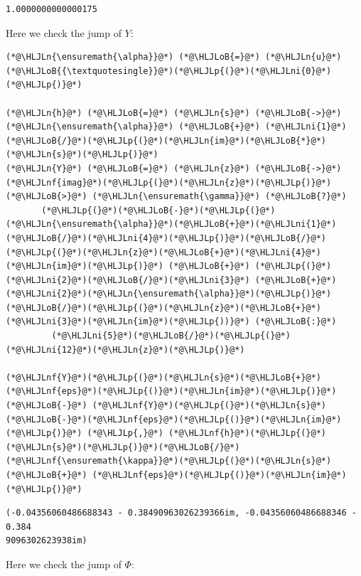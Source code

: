 \documentclass[12pt,a4paper]{article}
\newcommand{\HLJLn}[1]{#1}
\newcommand{\HLJLnf}[1]{\textcolor[RGB]{66,102,213}{#1}}
\newcommand{\HLJLni}[1]{\textcolor[RGB]{59,151,46}{#1}}
\newcommand{\HLJLoB}[1]{\textcolor[RGB]{102,102,102}{\textbf{#1}}}
\newcommand{\HLJLp}[1]{#1}
\begin{document}
\begin{lstlisting}
1.0000000000000175
\end{lstlisting}


Here we check the jump of $Y$:


\begin{lstlisting}
(*@\HLJLn{\ensuremath{\alpha}}@*) (*@\HLJLoB{=}@*) (*@\HLJLn{u}@*)(*@\HLJLoB{{\textquotesingle}}@*)(*@\HLJLp{(}@*)(*@\HLJLni{0}@*)(*@\HLJLp{)}@*)

(*@\HLJLn{h}@*) (*@\HLJLoB{=}@*) (*@\HLJLn{s}@*) (*@\HLJLoB{->}@*) (*@\HLJLn{\ensuremath{\alpha}}@*) (*@\HLJLoB{+}@*) (*@\HLJLni{1}@*)(*@\HLJLoB{/}@*)(*@\HLJLp{(}@*)(*@\HLJLn{im}@*)(*@\HLJLoB{*}@*)(*@\HLJLn{s}@*)(*@\HLJLp{)}@*)
(*@\HLJLn{Y}@*) (*@\HLJLoB{=}@*) (*@\HLJLn{z}@*) (*@\HLJLoB{->}@*) (*@\HLJLnf{imag}@*)(*@\HLJLp{(}@*)(*@\HLJLn{z}@*)(*@\HLJLp{)}@*) (*@\HLJLoB{>}@*) (*@\HLJLn{\ensuremath{\gamma}}@*) (*@\HLJLoB{?}@*) 
       (*@\HLJLp{(}@*)(*@\HLJLoB{-}@*)(*@\HLJLp{(}@*)(*@\HLJLn{\ensuremath{\alpha}}@*)(*@\HLJLoB{+}@*)(*@\HLJLni{1}@*)(*@\HLJLoB{/}@*)(*@\HLJLni{4}@*)(*@\HLJLp{)}@*)(*@\HLJLoB{/}@*)(*@\HLJLp{(}@*)(*@\HLJLn{z}@*)(*@\HLJLoB{+}@*)(*@\HLJLni{4}@*)(*@\HLJLn{im}@*)(*@\HLJLp{)}@*) (*@\HLJLoB{+}@*) (*@\HLJLp{(}@*)(*@\HLJLni{2}@*)(*@\HLJLoB{/}@*)(*@\HLJLni{3}@*) (*@\HLJLoB{+}@*) (*@\HLJLni{2}@*)(*@\HLJLn{\ensuremath{\alpha}}@*)(*@\HLJLp{)}@*)(*@\HLJLoB{/}@*)(*@\HLJLp{(}@*)(*@\HLJLn{z}@*)(*@\HLJLoB{+}@*)(*@\HLJLni{3}@*)(*@\HLJLn{im}@*)(*@\HLJLp{))}@*) (*@\HLJLoB{:}@*)
         (*@\HLJLni{5}@*)(*@\HLJLoB{/}@*)(*@\HLJLp{(}@*)(*@\HLJLni{12}@*)(*@\HLJLn{z}@*)(*@\HLJLp{)}@*)

(*@\HLJLnf{Y}@*)(*@\HLJLp{(}@*)(*@\HLJLn{s}@*)(*@\HLJLoB{+}@*)(*@\HLJLnf{eps}@*)(*@\HLJLp{()}@*)(*@\HLJLn{im}@*)(*@\HLJLp{)}@*) (*@\HLJLoB{-}@*) (*@\HLJLnf{Y}@*)(*@\HLJLp{(}@*)(*@\HLJLn{s}@*)(*@\HLJLoB{-}@*)(*@\HLJLnf{eps}@*)(*@\HLJLp{()}@*)(*@\HLJLn{im}@*)(*@\HLJLp{)}@*) (*@\HLJLp{,}@*) (*@\HLJLnf{h}@*)(*@\HLJLp{(}@*)(*@\HLJLn{s}@*)(*@\HLJLp{)}@*)(*@\HLJLoB{/}@*)(*@\HLJLnf{\ensuremath{\kappa}}@*)(*@\HLJLp{(}@*)(*@\HLJLn{s}@*) (*@\HLJLoB{+}@*) (*@\HLJLnf{eps}@*)(*@\HLJLp{()}@*)(*@\HLJLn{im}@*)(*@\HLJLp{)}@*)
\end{lstlisting}

\begin{lstlisting}
(-0.04356060486688343 - 0.38490963026239366im, -0.04356060486688346 - 0.384
9096302623938im)
\end{lstlisting}


Here we check the jump of $\Phi$:
\end{document}
